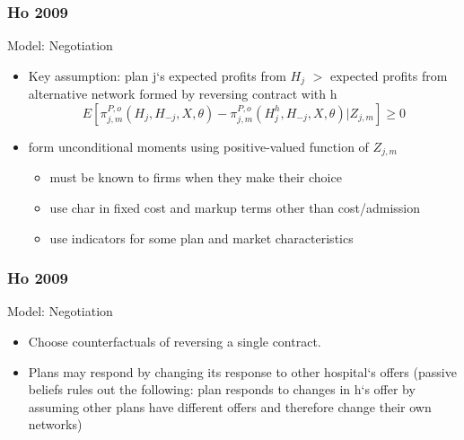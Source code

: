 \begin{frame}
\frametitle{Ho 2009}

Model: Negotiation
\begin{itemize}
\item Key assumption: plan j`s expected profits from $H_{j}$ $>$ expected profits from alternative network formed by reversing contract with h
\[
E[\pi _{j,m}^{P,o}(H_{j},H_{-j},X,\theta )-\pi
_{j,m}^{P,o}(H_{j}^{h},H_{-j},X,\theta )|Z_{j,m}]\geq 0
\]
\item form unconditional moments using positive-valued function of $Z_{j,m}$
\begin{itemize}
\item must be known to firms when they make their choice
\item use char in fixed cost and markup terms other than cost/admission
\item use indicators for some plan and market characteristics
\end{itemize}

\end{itemize}

\end{frame}

\begin{frame}
\frametitle{Ho 2009}

Model: Negotiation
\begin{itemize}
\item Choose counterfactuals of reversing a single contract.
\item Plans may respond by changing its response to other hospital`s offers (passive beliefs rules out the following: plan responds to changes in h`s offer by assuming other plans have different offers and therefore change their own networks)
\end{itemize}

\end{frame}


